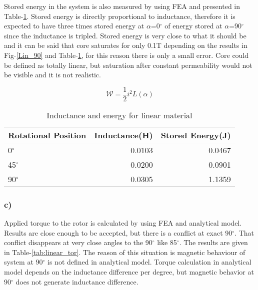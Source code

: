 \documentclass[11pt, a4paper]{article}
\begin{document}
Stored energy in the system is also measured by using FEA and presented in Table-\ref{tab:linear_in_en}. Stored energy is directly proportional to inductance, therefore it is expected to have three times stored energy at $\alpha$=0$^\circ$ of energy stored at $\alpha$=90$^\circ$ since the inductance is tripled. Stored energy is very close to what it should be and it can be said that core saturates for only 0.1T depending on the results in Fig-\ref{Lin_90} and Table-\ref{tab:linear_in_en}, for this reason there is only a small error. Core could be defined as totally linear, but saturation after constant permeability would not be visible and it is not realistic. 

\begin{equation}
\label{Energy}
\mathcal{W}=\frac{1}{2}i^2 L(\alpha)
\end{equation} 

\begin{table}[ht]
\centering
\caption{Inductance and energy for linear material} 
\begin{tabular}[t]{lrr}
\hline
Rotational Position        & Inductance(H) & Stored Energy(J)  \\
\hline
0$^\circ$     & 0.0103       & 0.0467     \\
45$^\circ$    & 0.0200       & 0.0901     \\
90$^\circ$    & 0.0305       & 1.1359       \\
\hline
\end{tabular}
\label{tab:linear_in_en}
\end{table}


\subsubsection*{c)}

Applied torque to the rotor is calculated by using FEA and analytical model. Results are close enough to be accepted, but there is a conflict at exact 90$^\circ$. That conflict disappears at very close angles to the 90$^\circ$ like 85$^\circ$. The results are given in Table-\ref{tab:linear_tor}. The reason of this situation is magnetic behaviour of system at 90$^\circ$ is not defined in analytical model. Torque calculation in analytical model depends on the inductance difference per degree, but magnetic behavior at 90$^\circ$ does not generate inductance difference.
\end{document}

